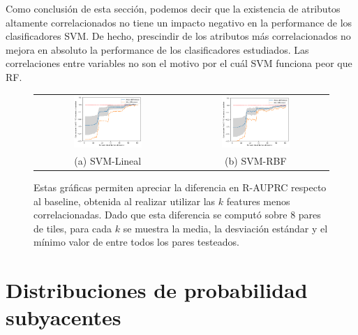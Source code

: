 Como conclusión de esta sección, podemos decir que la existencia de atributos altamente correlacionados no tiene un impacto negativo en la performance de los clasificadores SVM. De hecho, prescindir de los atributos más correlacionados no mejora en absoluto la performance de los clasificadores estudiados. Las correlaciones entre variables no son el motivo por el cuál SVM funciona peor que RF.

\begin{figure}[h!]
\begin{tabular}{cc}
  \includegraphics[width=0.49\textwidth]{Kap6/pearson_linear_CORRELATIONS_BIG_PICTURE.png} &   \includegraphics[width=0.49\textwidth]{Kap6/pearson_rbf_CORRELATIONS_BIG_PICTURE.png} \\
(a) SVM-Lineal & (b) SVM-RBF
\end{tabular}
\caption{Estas gráficas permiten apreciar la diferencia en R-AUPRC respecto al baseline, obtenida al realizar utilizar las $k$ features menos correlacionadas. Dado que esta diferencia se computó sobre 8 pares de tiles, para cada $k$ se muestra la media, la desviación estándar y el mínimo valor de entre todos los pares testeados. }
\label{fig:svm_correlation_summary}
\end{figure}

\section{Distribuciones de probabilidad subyacentes}

